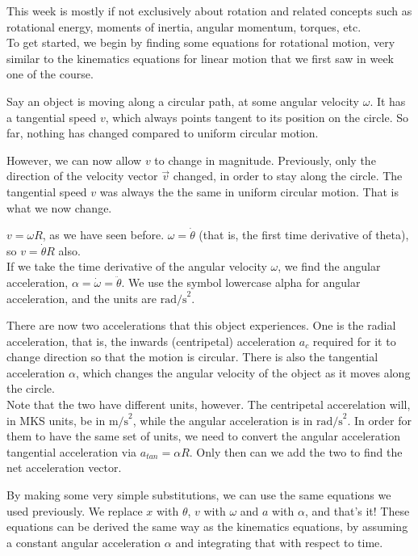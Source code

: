 \documentclass[12pt,a4paper]{report}
\begin{document}
This week is mostly if not exclusively about rotation and related concepts such as rotational energy, moments of inertia, angular momentum, torques, etc.\\
To get started, we begin by finding some equations for rotational motion, very similar to the kinematics equations for linear motion that we first saw in week one of the course.

Say an object is moving along a circular path, at some angular velocity $\omega$. It has a tangential speed $v$, which always points tangent to its position on the circle. So far, nothing has changed compared to uniform circular motion.

However, we can now allow $v$ to change in magnitude. Previously, only the direction of the velocity vector $\vec{v}$ changed, in order to stay along the circle. The tangential speed $v$ was always the the same in uniform circular motion. That is what we now change.

$v = \omega R$, as we have seen before. $\omega = \dot{\theta}$ (that is, the first time derivative of theta), so $v = \dot{\theta} R$ also.\\
If we take the time derivative of the angular velocity $\omega$, we find the angular acceleration, $\alpha = \dot{\omega} = \ddot{\theta}$. We use the symbol lowercase alpha for angular acceleration, and the units are $\text{rad/s}^2$.

There are now two accelerations that this object experiences. One is the radial acceleration, that is, the inwards (centripetal) acceleration $a_c$ required for it to change direction so that the motion is circular. There is also the tangential acceleration $\alpha$, which changes the angular velocity of the object as it moves along the circle.\\
Note that the two have different units, however. The centripetal accerelation will, in MKS units, be in $\text{m/s}^2$, while the angular acceleration is in $\text{rad/s}^2$. In order for them to have the same set of units, we need to convert the angular acceleration tangential acceleration via $a_{tan} = \alpha R$. Only then can we add the two to find the net acceleration vector.

By making some very simple substitutions, we can use the same equations we used previously. We replace $x$ with $\theta$, $v$ with $\omega$ and $a$ with $\alpha$, and that's it! These equations can be derived the same way as the kinematics equations, by assuming a constant angular acceleration $\alpha$ and integrating that with respect to time.
\end{document}
